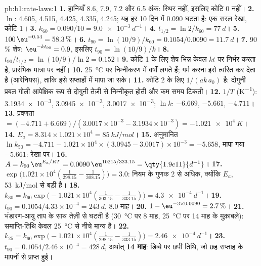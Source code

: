 \begin{solution}{pb:b1:rate-laws:1}
\textbf{1.} हानियाँ 8.6, 7.9, 7.2 और 6.5 अंक: स्थिर नहीं, इसलिए
कोटि 0 नहीं।
\textbf{2.} $\ln$: 4.605, 4.515, 4.425, 4.335, 4.245; यह हर 10 दिन में 0.090
घटता है: एक सरल रेखा, कोटि 1।
\textbf{3.} $k_{60} = 0.090/10 = \qty{9.0e-3}{d^{-1}}$।
\textbf{4.} $t_{1/2} = \ln2/k_{60} = \qty{77}{d}$।
\textbf{5.} $100\,\eu^{-0.54} = 58.3\,\%$।
\textbf{6.} $t_{90} = \ln(10/9)/k_{60} = 0.1054/0.0090 = \qty{11.7}{d}$।
\textbf{7.} 90\,\% शेष: $\eu^{-kt_{90}} = 0.9$, इसलिए $t_{90} = \ln(10/9)/k$।
\textbf{8.} $t_{90}/t_{1/2} = \ln(10/9)/\ln2 = 0.152$।
\textbf{9.} कोटि 1 के लिए शेष भिन्न केवल $kt$ पर निर्भर करता है,
प्रारंभिक मात्रा पर नहीं।
\textbf{10.} \qty{25}{\celsius} पर निम्नीकरण में वर्षों लगते हैं; गर्म करना
इसे त्वरित कर देता है (आरेनियस), ताकि इसे सप्ताहों में मापा जा सके।
\textbf{11.} कोटि 2 के लिए  $1/(ak\,a_0)$ है: दोगुनी
प्रबल गोली आपेक्षिक रूप से दोगुनी तेज़ी से निम्नीकृत होती और कम समय टिकती।
\textbf{12.} $1/T$ (\unit{K^{-1}}): \num{3.1934e-3}, \num{3.0945e-3},
\num{3.0017e-3}; $\ln k$: $-6.669$, $-5.661$, $-4.711$।
\textbf{13.} प्रवणता $= (-4.711 + 6.669)/(3.0017 \times 10^{-3} - 3.1934 \times
10^{-3}) = \qty{-1.021e4}{K}$।
\textbf{14.} $E_a = 8.314 \times 1.021 \times 10^4 = \qty{85}{kJ/mol}$।
\textbf{15.} अनुमानित $\ln k_{50} = -4.711 - 1.021 \times 10^4 \times (3.0945 -
3.0017) \times 10^{-3} = -5.658$, मापा गया $-5.661$: रेखा पर।
\textbf{16.} $A = k_{60}\,\eu^{E_a/RT} = 0.0090\,\eu^{10215/333.15} =
\qty{1.9e11}{d^{-1}}$।
\textbf{17.} $\exp\big(1.021 \times 10^4(\frac{1}{298.15} -
\frac{1}{308.15})\big) = 3.0$: नियम के गुणक 2 से अधिक, क्योंकि
$E_a$, \qty{53}{kJ/mol} से बड़ी है।
\textbf{18.} $k_{30} = k_{60}\exp\big(-1.021 \times 10^4(\frac{1}{303.15} -
\frac{1}{333.15})\big) = \qty{4.3e-4}{d^{-1}}$।
\textbf{19.} $t_{90} = 0.1054/4.33 \times 10^{-4} = \qty{243}{d}$, 8.0
माह।
\textbf{20.} $1 - \eu^{-3 \times 0.0090} = 2.7\,\%$।
\textbf{21.} भंडारण-आयु ताप के साथ तेज़ी से घटती है (\qty{30}{\celsius} पर 8 माह,
\qty{25}{\celsius} पर 14 माह के मुक़ाबले): समाप्ति-तिथि
केवल \qty{25}{\celsius} से नीचे मान्य है।
\textbf{22.} $k_{25} = k_{60}\exp\big(-1.021 \times 10^4(\frac{1}{298.15} -
\frac{1}{333.15})\big) = \qty{2.46e-4}{d^{-1}}$।
\textbf{23.} $t_{90} = 0.1054/2.46 \times 10^{-4} = \qty{428}{d}$, अर्थात्
\textbf{14 माह}: डिब्बे पर छपी तिथि, जो छह
सप्ताह के मापनों से प्राप्त हुई।
\end{solution}
